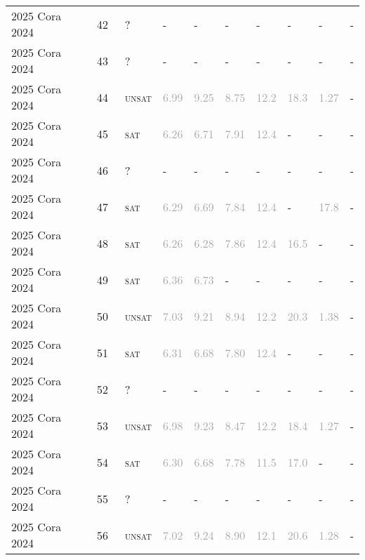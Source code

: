 \begin{center}
{\begin{longtable}{@{}llllllllll@{}}
2025 Cora 2024 & 42 & ~? & - & - & - & - & - & - & - \\
2025 Cora 2024 & 43 & ~? & - & - & - & - & - & - & - \\
2025 Cora 2024 & 44 & ~\textsc{unsat} & \textcolor{darkgray}{6.99} & \textcolor{darkgray}{9.25} & \textcolor{darkgray}{8.75} & \textcolor{darkgray}{12.2} & \textcolor{darkgray}{18.3} & \textcolor{darkgray}{1.27} & - \\
2025 Cora 2024 & 45 & ~\textsc{sat} & \textcolor{darkgray}{6.26} & \textcolor{darkgray}{6.71} & \textcolor{darkgray}{7.91} & \textcolor{darkgray}{12.4} & - & - & - \\
2025 Cora 2024 & 46 & ~? & - & - & - & - & - & - & - \\
2025 Cora 2024 & 47 & ~\textsc{sat} & \textcolor{darkgray}{6.29} & \textcolor{darkgray}{6.69} & \textcolor{darkgray}{7.84} & \textcolor{darkgray}{12.4} & - & \textcolor{darkgray}{17.8} & - \\
2025 Cora 2024 & 48 & ~\textsc{sat} & \textcolor{darkgray}{6.26} & \textcolor{darkgray}{6.28} & \textcolor{darkgray}{7.86} & \textcolor{darkgray}{12.4} & \textcolor{darkgray}{16.5} & - & - \\
2025 Cora 2024 & 49 & ~\textsc{sat} & \textcolor{darkgray}{6.36} & \textcolor{darkgray}{6.73} & - & - & - & - & - \\
2025 Cora 2024 & 50 & ~\textsc{unsat} & \textcolor{darkgray}{7.03} & \textcolor{darkgray}{9.21} & \textcolor{darkgray}{8.94} & \textcolor{darkgray}{12.2} & \textcolor{darkgray}{20.3} & \textcolor{darkgray}{1.38} & - \\
2025 Cora 2024 & 51 & ~\textsc{sat} & \textcolor{darkgray}{6.31} & \textcolor{darkgray}{6.68} & \textcolor{darkgray}{7.80} & \textcolor{darkgray}{12.4} & - & - & - \\
2025 Cora 2024 & 52 & ~? & - & - & - & - & - & - & - \\
2025 Cora 2024 & 53 & ~\textsc{unsat} & \textcolor{darkgray}{6.98} & \textcolor{darkgray}{9.23} & \textcolor{darkgray}{8.47} & \textcolor{darkgray}{12.2} & \textcolor{darkgray}{18.4} & \textcolor{darkgray}{1.27} & - \\
2025 Cora 2024 & 54 & ~\textsc{sat} & \textcolor{darkgray}{6.30} & \textcolor{darkgray}{6.68} & \textcolor{darkgray}{7.78} & \textcolor{darkgray}{11.5} & \textcolor{darkgray}{17.0} & - & - \\
2025 Cora 2024 & 55 & ~? & - & - & - & - & - & - & - \\
2025 Cora 2024 & 56 & ~\textsc{unsat} & \textcolor{darkgray}{7.02} & \textcolor{darkgray}{9.24} & \textcolor{darkgray}{8.90} & \textcolor{darkgray}{12.1} & \textcolor{darkgray}{20.6} & \textcolor{darkgray}{1.28} & - \\

\end{longtable}}
\end{center}
